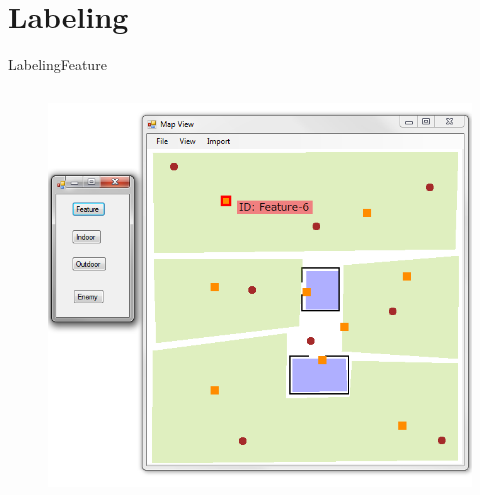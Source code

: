 \section{Labeling}

\begin{frame}{Labeling}{Feature}

\begin{columns}
\begin{figure}
\centering
\includegraphics[width = \textwidth]{./screenshot/feature_label.png}
\end{figure}

\begin{minipage}{\textwidth}
\end{minipage}
\end{columns}

\end{frame}

